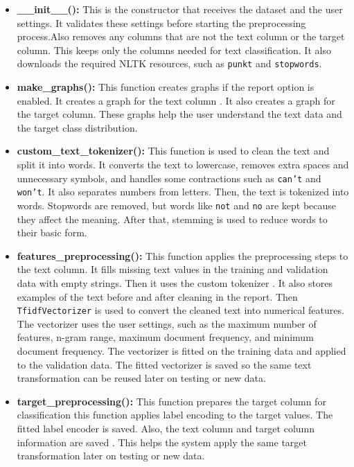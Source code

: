 \documentclass[12pt,a4paper]{report}
\begin{document}
\begin{itemize}
    \item \textbf{\_\_init\_\_():}
     This is the constructor that receives the dataset and the user settings. 
     It validates these settings before starting the preprocessing process.Also removes any columns that are not the text column or the target
     column. This keeps only the columns needed for text classification. It also
    downloads the required NLTK resources, such as \texttt{punkt} and
    \texttt{stopwords}.
    \item \textbf{make\_graphs():}
    This function creates graphs if the report option is enabled. It creates a graph for
    the text column . It also creates a graph for the target column. These graphs help the user understand the text data and the target class distribution.

    \item \textbf{custom\_text\_tokenizer():}
    This function is used to clean the text and split it into words. It converts the text to
    lowercase, removes extra spaces and unnecessary symbols, and handles some contractions
    such as \texttt{can't} and \texttt{won't}. It also separates numbers from letters.
    Then, the text is tokenized into words. Stopwords are removed, but words like
    \texttt{not} and \texttt{no} are kept because they affect the meaning. After that,
    stemming is used to reduce words to their basic form.

\item \textbf{features\_preprocessing():}
This function applies the preprocessing steps to the text column. It fills
missing text values in the training and validation data with empty strings. 
Then it uses the custom tokenizer . It also stores examples of the text
before and after cleaning in the report. Then \texttt{TfidfVectorizer} is used to convert the cleaned text into numerical
features. The vectorizer uses the user settings, such as the maximum number of
features, n-gram range, maximum document frequency, and minimum document frequency.
The vectorizer is fitted on the training data and applied to the validation
data. The fitted vectorizer is saved so the same
text transformation can be reused later on testing or new data.

\item \textbf{target\_preprocessing():}
This function prepares the target column for classification this function  applies label
encoding to the target values. The fitted label encoder is saved. Also, the text
column and target column information are saved . This helps the
system apply the same target transformation later on testing or new data.


\end{itemize}
\end{document}
